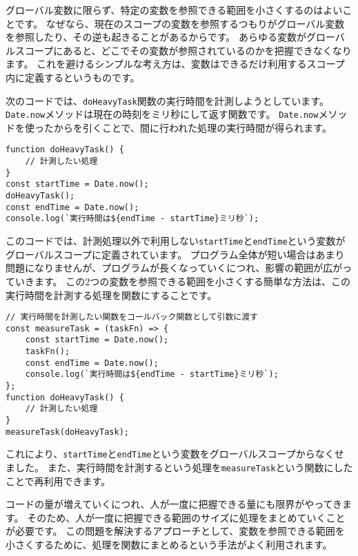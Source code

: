 \begin{tcolorbox}[enhanced jigsaw,breakable,title=変数を参照できる範囲を小さくする]\label{reduce-scope}

グローバル変数に限らず、特定の変数を参照できる範囲を小さくするのはよいことです。
なぜなら、現在のスコープの変数を参照するつもりがグローバル変数を参照したり、その逆も起きることがあるからです。
あらゆる変数がグローバルスコープにあると、どこでその変数が参照されているのかを把握できなくなります。
これを避けるシンプルな考え方は、変数はできるだけ利用するスコープ内に定義するというものです。

次のコードでは、\texttt{doHeavyTask}関数の実行時間を計測しようとしています。
\texttt{Date.now}メソッドは現在の時刻をミリ秒にして返す関数です。
\texttt{Date.now}メソッドを使った\textbf{}から\textbf{}を引くことで、間に行われた処理の実行時間が得られます。

\begin{lstlisting}
function doHeavyTask() {
    // 計測したい処理
}
const startTime = Date.now();
doHeavyTask();
const endTime = Date.now();
console.log(`実行時間は${endTime - startTime}ミリ秒`);
\end{lstlisting}

このコードでは、計測処理以外で利用しない\texttt{startTime}と\texttt{endTime}という変数がグローバルスコープに定義されています。
プログラム全体が短い場合はあまり問題になりませんが、プログラムが長くなっていくにつれ、影響の範囲が広がっていきます。
この2つの変数を参照できる範囲を小さくする簡単な方法は、この実行時間を計測する処理を関数にすることです。

\begin{lstlisting}
// 実行時間を計測したい関数をコールバック関数として引数に渡す
const measureTask = (taskFn) => {
    const startTime = Date.now();
    taskFn();
    const endTime = Date.now();
    console.log(`実行時間は${endTime - startTime}ミリ秒`);
};
function doHeavyTask() {
    // 計測したい処理
}
measureTask(doHeavyTask);
\end{lstlisting}

これにより、\texttt{startTime}と\texttt{endTime}という変数をグローバルスコープからなくせました。
また、実行時間を計測するという処理を\texttt{measureTask}という関数にしたことで再利用できます。

コードの量が増えていくにつれ、人が一度に把握できる量にも限界がやってきます。
そのため、人が一度に把握できる範囲のサイズに処理をまとめていくことが必要です。
この問題を解決するアプローチとして、変数を参照できる範囲を小さくするために、処理を関数にまとめるという手法がよく利用されます。
\end{tcolorbox}

